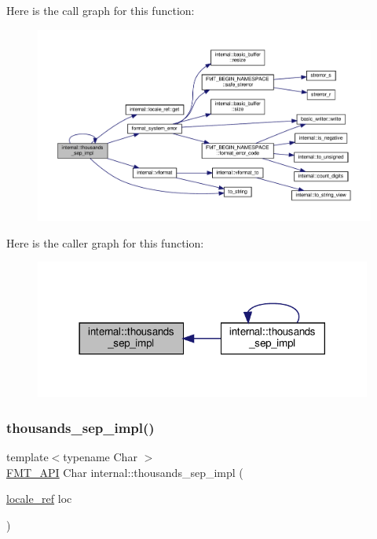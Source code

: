 Here is the call graph for this function\+:
\nopagebreak
\begin{figure}[H]
\begin{center}
\leavevmode
\includegraphics[width=350pt]{namespaceinternal_a70aa19597fbb8bad857a307b17c6b478_cgraph}
\end{center}
\end{figure}
Here is the caller graph for this function\+:
\nopagebreak
\begin{figure}[H]
\begin{center}
\leavevmode
\includegraphics[width=314pt]{namespaceinternal_a70aa19597fbb8bad857a307b17c6b478_icgraph}
\end{center}
\end{figure}
\mbox{\label{namespaceinternal_a0eb92e21789faf5174aa9bb86bb78539}} 
\subsubsection{\texorpdfstring{thousands\+\_\+sep\+\_\+impl()}{thousands\_sep\_impl()}\hspace{0.1cm}{\footnotesize\ttfamily [2/2]}}
{\footnotesize\ttfamily template$<$typename Char $>$ \\
\hyperlink{core_8h_a9a4960b70582ed2620911a0b75dce0b5}{F\+M\+T\+\_\+\+A\+PI} Char internal\+::thousands\+\_\+sep\+\_\+impl (\begin{DoxyParamCaption}\item[{\hyperlink{classinternal_1_1locale__ref}{locale\+\_\+ref}}]{loc }\end{DoxyParamCaption})}



